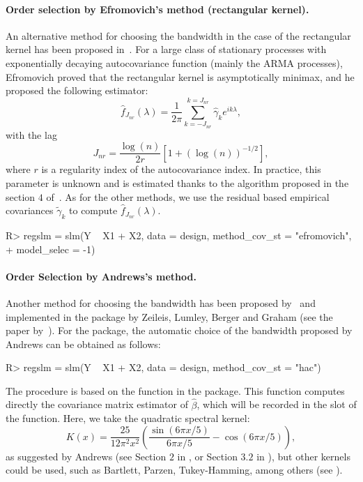 \paragraph{Order selection by Efromovich's method (rectangular kernel).}
An alternative method for choosing the bandwidth in the case of the rectangular kernel has been proposed in~\cite{efromovich1998data}. For a large class of stationary processes with exponentially decaying autocovariance function (mainly the ARMA processes), Efromovich proved that the rectangular kernel is asymptotically minimax, and he proposed the following estimator:
\[\hat{f}_{J_{nr}}(\lambda) = \frac{1}{2 \pi} \sum_{k=-J_{nr}}^{k=J_{nr}} \hat{\gamma}_{k} e^{i k \lambda},\]
with the lag 
$$J_{nr} = \frac{\log(n)}{2r} \left[ 1 + (\log(n))^{-1/2} \right],$$
where $r$ is a regularity index of the autocovariance index. In practice, this parameter is unknown and is estimated thanks to the algorithm proposed in the section $4$ of~\cite{efromovich1998data}.
As for the other methods, we use the residual based empirical covariances $\tilde{\gamma}_{k}$ to compute $\hat{f}_{J_{nr}}(\lambda)$.
\begin{Schunk}
\begin{Sinput}
R> regslm = slm(Y ~ X1 + X2, data = design, method_cov_st = "efromovich",
+  	model_selec = -1)
\end{Sinput}
\end{Schunk}

\paragraph{Order Selection by Andrews's method.}
Another method for choosing the bandwidth has been proposed by~\cite{andrews1991heteroskedasticity} 
and implemented in the package  by Zeileis, Lumley, Berger and Graham (see the paper by~\cite{zeileis2004econometric}). For the  package, the automatic choice of the bandwidth proposed by Andrews can be obtained  as follows: 
\begin{Schunk}
\begin{Sinput}
R> regslm = slm(Y ~ X1 + X2, data = design, method_cov_st = "hac")
\end{Sinput}
\end{Schunk}
The procedure is based on the function  in the  package. This function computes directly the covariance matrix estimator of $\hat{\beta}$, which will be recorded in the slot  of the  function.
Here, we take the quadratic spectral kernel: 
$$
K \left( x \right) = \frac{25}{12 \pi^{2} x^{2}} \left( \frac{\sin \left( 6 \pi x / 5 \right) }{6 \pi x / 5} - \cos \left( 6 \pi x / 5 \right) \right),
$$
as suggested by Andrews (see Section $2$ in \cite{andrews1991heteroskedasticity}, or Section $3.2$ in \cite{zeileis2004econometric}), but other kernels could be used, such as Bartlett, Parzen, Tukey-Hamming, among others (see \cite{zeileis2004econometric}). 

